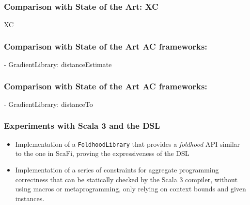 \begin{frame}
    \frametitle{Comparison with State of the Art: \ac{XC}}
    \begin{exampleblock}{\ac{XC}}
        
    \end{exampleblock}
\end{frame}

\begin{frame}
    \frametitle{Comparison with State of the Art \ac{AC} frameworks: \this}
    \begin{exampleblock}{\this - GradientLibrary: distanceEstimate}
        
    \end{exampleblock}
\end{frame}

\begin{frame}
    \frametitle{Comparison with State of the Art \ac{AC} frameworks: \this}
    \begin{exampleblock}{\this - GradientLibrary: distanceTo}
        
    \end{exampleblock}
\end{frame}

\begin{frame}
    \frametitle{Experiments with Scala 3 and the \ac{DSL}}
    \begin{itemize}
        \item Implementation of a \texttt{FoldhoodLibrary} that provides a \textit{foldhood} \ac{API} similar to the one in ScaFi, proving the expressiveness of the \this \ac{DSL}
        \item Implementation of a series of constraints for aggregate programming correctness that can be statically checked by the Scala 3 compiler, without using macros or metaprogramming, only relying on context bounds and given instances.
    \end{itemize}
\end{frame}

